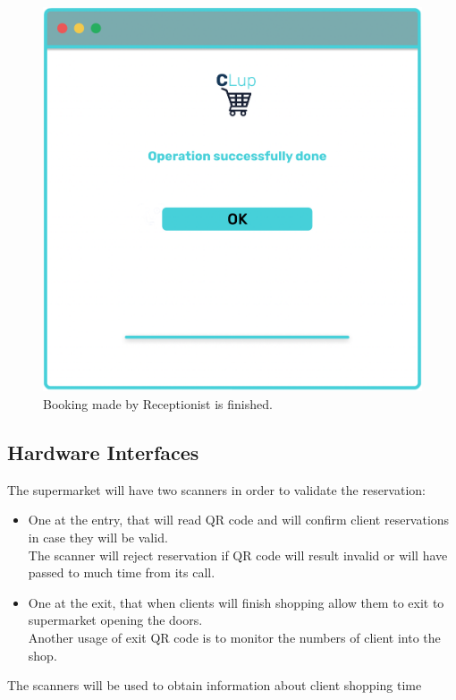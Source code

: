 \begin{figure}[H]
  \caption{Booking made by Receptionist is finished.}
  \label{fig:Login}
  \centering
  \includegraphics[scale=0.32]{images/mockup/Done_Rec.png}

\end{figure}
\par
\pagebreak

\subsection{Hardware Interfaces}
The supermarket will have two scanners in order to validate the reservation:

\par \medskip 
\begin{itemize}
\item	One at the entry, that will read QR code and will confirm client reservations in case they will be valid. \\
The scanner will reject reservation if QR code will result invalid or will have passed to much time from its call.
\item One at the exit, that when clients will finish shopping allow them to exit to supermarket opening the doors. \\
Another usage of exit QR code is to monitor the numbers of client into the shop.
\end{itemize} 
\par \medskip 
The scanners will be used to obtain information about client shopping time
